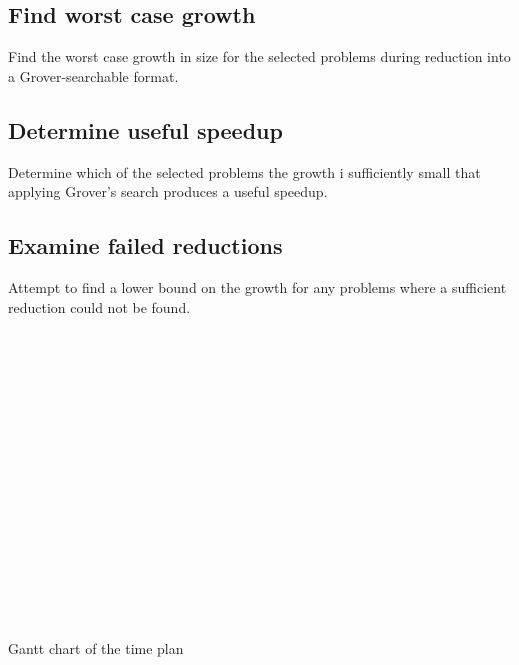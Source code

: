 \documentclass[msc,lith,english]{liuthesis}
\begin{document}
\subsection{Find worst case growth}
Find the worst case growth in size for the selected problems during reduction into a Grover-searchable format.

\subsection{Determine useful speedup}
Determine which of the selected problems the growth i sufficiently small that applying Grover's search produces a useful speedup.

\subsection{Examine failed reductions}
Attempt to find a lower bound on the growth for any problems where a sufficient reduction could not be found.

\begin{table}
  \begin{ganttchart}{1}{23}
     \\
     \\
     \\
     \\
     \\
     \\
     \\

     \\

     \\

     \\
     \\
     \\
     \\
     \\
     \\
  \end{ganttchart}
  \caption{Gantt chart of the time plan}\label{gantt}
\end{table}
\end{document}
